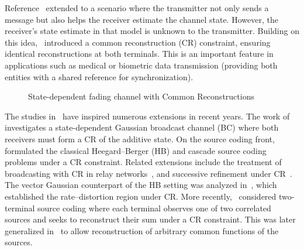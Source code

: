 \documentclass[journal]{IEEEtran}
\def\bS{\mathbf S}
\def\bhS{\hat{\mathbf S}}
\def\bhS{\hat{\mathbf S}}
\begin{document}
Reference~\cite{sutivong2005channel} extended \cite{costa1983writing} to a scenario where the transmitter not only sends a message but also helps the receiver estimate the channel state. However, the receiver’s state estimate in that model is unknown to the transmitter. Building on this idea,~\cite{steinberg2009coding} introduced a common reconstruction (CR) constraint, ensuring identical reconstructions at both terminals. This is an important feature in applications such as medical or biometric data transmission (providing both entities with a shared reference for synchronization).

\begin{figure}[h]
\begin{center}
\end{center}
\label{fig:model}
\caption{State-dependent fading channel with Common Reconstructions\label{fig:bc2}}
\end{figure}

The studies in~\cite{steinberg2009coding} have inspired numerous extensions in recent years. The work of \cite{ramachandran2018state} investigates a state-dependent Gaussian broadcast channel (BC) where both receivers must form a CR of the additive state. On the source coding front,~\cite{ahmadi2013heegard} formulated the classical Heegard–Berger (HB) and cascade source coding problems under a CR constraint. Related extensions include the treatment of broadcasting with CR in relay networks~\cite{timo2010lossy}, and successive refinement under CR~\cite{vellambi2014successive}. The vector Gaussian counterpart of the HB setting was analyzed in~\cite{lu2021vector}, which established the rate–distortion region under CR. More recently,~\cite{adikari2022two} considered two-terminal source coding where each terminal observes one of two correlated sources and seeks to reconstruct their sum under a CR constraint. This was later generalized in~\cite{adikari2024common} to allow reconstruction of arbitrary common functions of the sources.
\end{document}
